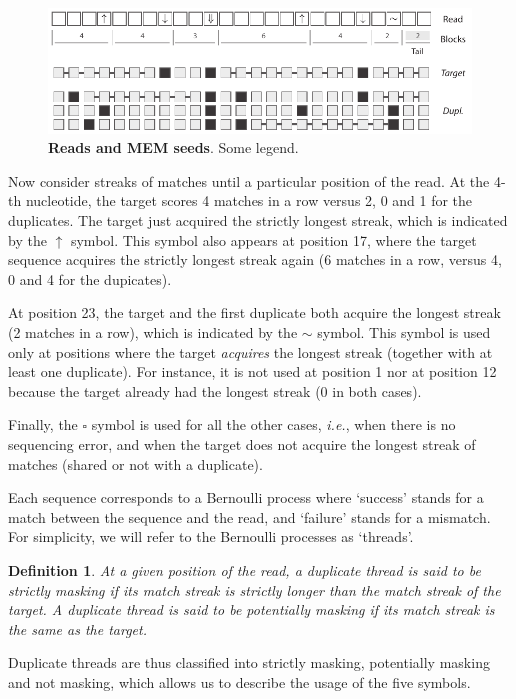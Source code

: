 \documentclass{article}
\newtheorem{definition}{Definition}
\begin{document}
\begin{figure}[h]
\centering
\includegraphics[scale=.9]{sketch_MEM.pdf}
\caption{\textbf{Reads and MEM seeds}. 
Some legend.}
\label{fig:sketch_MEM}
\end{figure}

Now consider streaks of matches until a particular position of the read.
At the 4-th nucleotide, the target scores 4 matches in a row versus 2, 0
and 1 for the duplicates. The target just acquired the strictly longest
streak, which is indicated by the $\uparrow$ symbol. This symbol also
appears at position 17, where the target sequence acquires the strictly
longest streak again (6 matches in a row, versus 4, 0 and 4 for the
dupicates).

At position 23, the target and the first duplicate both acquire the
longest streak (2 matches in a row), which is indicated by the $\sim$
symbol. This symbol is used only at positions where the target
\emph{acquires} the longest streak (together with at least one duplicate).
For instance, it is not used at position 1 nor at position 12 because the
target already had the longest streak (0 in both cases).

Finally, the $\square$ symbol is used for all the other cases,
\textit{i.e.}, when there is no sequencing error, and when the target does
not acquire the longest streak of matches (shared or not with a
duplicate).

Each sequence corresponds to a Bernoulli process where `success' stands
for a match between the sequence and the read, and `failure' stands for a
mismatch. For simplicity, we will refer to the Bernoulli processes as
`threads'.

\begin{definition}
At a given position of the read, a duplicate thread is said to be
\emph{strictly masking} if its match streak is strictly longer than the
match streak of the target. A duplicate thread is said to be
\emph{potentially masking} if its match streak is the same as the target.
\end{definition}

Duplicate threads are thus classified into strictly masking, potentially
masking and not masking, which allows us to describe the usage of the five
symbols.
\end{document}
